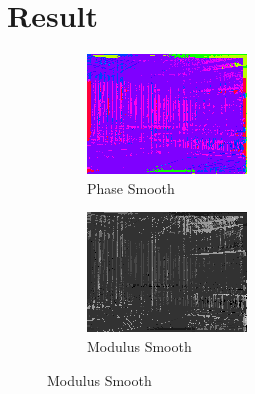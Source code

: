 \documentclass[10pt]{report}
\begin{document}
\section{Result}
\begin{figure}[H]
\centering
        \begin{subfigure}[b]{0.3\textwidth}
                \centering
                \includegraphics[width=\textwidth]{D0-angle.png}
                \caption{Phase Smooth}
                \label{fig:ps}
        \end{subfigure}
        \begin{subfigure}[b]{0.3\textwidth}
                \centering
                \includegraphics[width=\textwidth]{D0-norm.png}
                \caption{Modulus Smooth}

\end{subfigure}
\end{figure}
\end{document}
